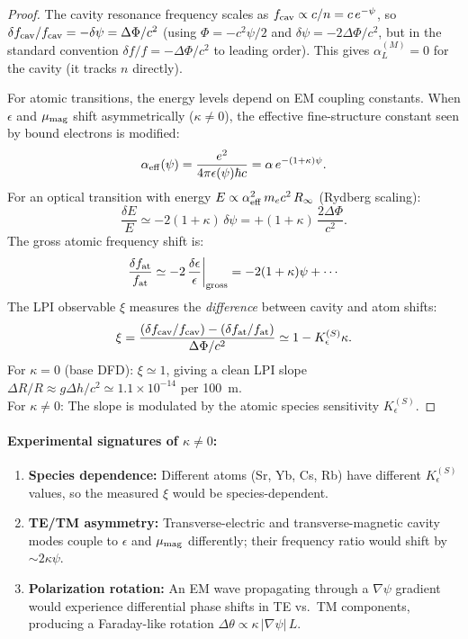 \documentclass[11pt]{article}
\begin{document}
\begin{proof}
The cavity resonance frequency scales as $f_{\rm cav} \propto c/n = c\, e^{-\psi}$,
so $\delta f_{\rm cav}/f_{\rm cav} = -\delta\psi = \Delta\Phi/c^2$ (using
$\Phi = -c^2\psi/2$ and $\delta\psi = -2\Delta\Phi/c^2$, but in the
standard convention $\delta f/f = -\Delta\Phi/c^2$ to leading order).
This gives $\alpha_L^{(M)} = 0$ for the cavity (it tracks $n$ directly).

For atomic transitions, the energy levels depend on EM coupling constants.
When $\epsilon$ and $\mu_{\rm mag}$ shift asymmetrically ($\kappa \neq 0$),
the effective fine-structure constant seen by bound electrons is modified:
\begin{equation}
\alpha_{\rm eff}(\psi) = \frac{e^2}{4\pi\epsilon(\psi)\hbar c}
= \alpha\, e^{-(1+\kappa)\psi}.
\end{equation}
For an optical transition with energy $E \propto \alpha_{\rm eff}^2\, m_e c^2\, R_\infty$
(Rydberg scaling):
\begin{equation}
\frac{\delta E}{E} \simeq -2(1+\kappa)\,\delta\psi = +(1+\kappa)\,\frac{2\Delta\Phi}{c^2}.
\end{equation}
The gross atomic frequency shift is:
\begin{equation}
\frac{\delta f_{\rm at}}{f_{\rm at}} \simeq -2\,\frac{\delta\epsilon}{\epsilon}\bigg|_{\rm gross}
= -2(1+\kappa)\psi + \cdots
\end{equation}
The LPI observable $\xi$ measures the \emph{difference} between cavity and atom shifts:
\begin{equation}
\xi = \frac{(\delta f_{\rm cav}/f_{\rm cav}) - (\delta f_{\rm at}/f_{\rm at})}{\Delta\Phi/c^2}
\simeq 1 - K_\epsilon^{(S)}\kappa.
\end{equation}
For $\kappa = 0$ (base DFD): $\xi \simeq 1$, giving a clean LPI slope
$\Delta R/R \approx g\Delta h/c^2 \simeq 1.1\times 10^{-14}$ per 100~m.\\
For $\kappa \neq 0$: The slope is modulated by the atomic species sensitivity
$K_\epsilon^{(S)}$.
\end{proof}

\paragraph{Experimental signatures of $\kappa \neq 0$:}
\begin{enumerate}
\item \textbf{Species dependence:}  Different atoms (Sr, Yb, Cs, Rb)
  have different $K_\epsilon^{(S)}$ values, so the measured $\xi$ would
  be species-dependent.
\item \textbf{TE/TM asymmetry:}  Transverse-electric and transverse-magnetic
  cavity modes couple to $\epsilon$ and $\mu_{\rm mag}$ differently;
  their frequency ratio would shift by $\sim 2\kappa\psi$.
\item \textbf{Polarization rotation:}  An EM wave propagating through a
  $\nabla\psi$ gradient would experience differential phase shifts in
  TE vs.\ TM components, producing a Faraday-like rotation
  $\Delta\theta \propto \kappa\,|\nabla\psi|\,L$.
\end{enumerate}
\end{document}
